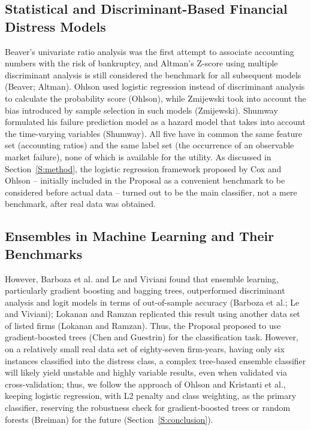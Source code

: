 \documentclass[final,1p,times]{elsarticle}
\begin{document}
\subsection{Statistical and Discriminant-Based Financial Distress Models}

Beaver's univariate ratio analysis was the first attempt to associate accounting numbers with the risk of bankruptcy, and Altman's Z-score using multiple discriminant analysis is still considered the benchmark for all subsequent models (Beaver; Altman). Ohlson used logistic regression instead of discriminant analysis to calculate the probability score (Ohlson), while Zmijewski took into account the bias introduced by sample selection in such models (Zmijewski). Shumway formulated his failure prediction model as a hazard model that takes into account the time-varying variables (Shumway). All five have in common the same feature set (accounting ratios) and the same label set (the occurrence of an observable market failure), none of which is available for the utility. As discussed in Section~\ref{S:method}, the logistic regression framework proposed by Cox and Ohlson -- initially included in the Proposal as a convenient benchmark to be considered before actual data -- turned out to be the main classifier, not a mere benchmark, after real data was obtained.

\subsection{Ensembles in Machine Learning and Their Benchmarks}

However, Barboza et al. and Le and Viviani found that ensemble learning, particularly gradient boosting and bagging trees, outperformed discriminant analysis and logit models in terms of out-of-sample accuracy (Barboza et al.; Le and Viviani); Lokanan and Ramzan replicated this result using another data set of listed firms (Lokanan and Ramzan). Thus, the Proposal proposed to use gradient-boosted trees (Chen and Guestrin) for the classification task. However, on a relatively small real data set of eighty-seven firm-years, having only six instances classified into the distress class, a complex tree-based ensemble classifier will likely yield unstable and highly variable results, even when validated via cross-validation; thus, we follow the approach of Ohlson and Kristanti et al., keeping logistic regression, with L2 penalty and class weighting, as the primary classifier, reserving the robustness check for gradient-boosted trees or random forests (Breiman) for the future (Section~\ref{S:conclusion}).
\end{document}
